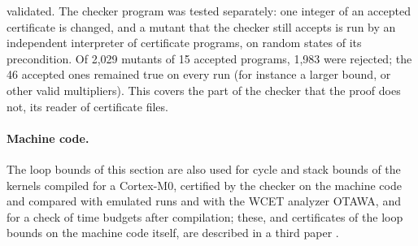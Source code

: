 \documentclass[oneside,english]{amsart}
\numberwithin{equation}{section}
\numberwithin{figure}{section}
\theoremstyle{plain}
\theoremstyle{definition}
\theoremstyle{plain}
\theoremstyle{remark}
\theoremstyle{plain}
\theoremstyle{definition}
\theoremstyle{plain}
\theoremstyle{remark}
\begin{document}
validated. The checker program was tested separately: one integer of an accepted certificate is changed, and a mutant that the checker still accepts is run by an independent interpreter of certificate programs, on random states of its precondition. Of 2{,}029 mutants of 15 accepted programs, 1{,}983 were rejected; the 46 accepted ones remained true on every run (for instance a larger bound, or other valid multipliers). This covers the part of the checker that the proof does not, its reader of certificate files.

\paragraph{Machine code.}
The loop bounds of this section are also used for cycle and stack bounds of the kernels compiled for a Cortex-M0, certified by the checker on the machine code and compared with emulated runs and with the WCET analyzer OTAWA, and for a check of time budgets after compilation; these, and certificates of the loop bounds on the machine code itself, are described in a third paper \cite{crosscheckBinary}.
\end{document}
